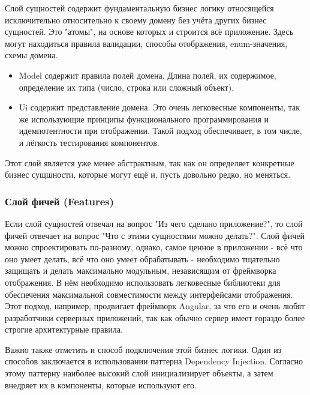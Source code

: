 \documentclass[14pt]{extarticle}
\begin{document}
Слой сущностей содержит фундаментальную бизнес логику относящейся исключительно относительно к своему домену без учёта других бизнес сущностей. 
Это "атомы", на основе которых и строится всё приложение. Здесь
могут находиться правила валидации, способы отображения, enum-значения, схемы домена.

\begin{itemize}
	\item Model содержит правила полей домена. Длина полей, их содержимое, определение их типа (число, строка или сложный объект).
	\item Ui содержит представление домена. Это очень легковесные компоненты, так же использующие принципы функционального программирования и идемпотентности
	при отображении. Такой подход обеспечивает, в том числе, и лёгкость тестирования компонентов.
\end{itemize}

Этот слой является уже менее абстрактным, так как он определяет конкретные бизнес сущшности, которые могут ещё и, пусть довольно редко, но меняться.

\subsubsection{Слой фичей (Features)}

Если слой сущностей отвечал на вопрос "Из чего сделано приложение?", то слой фичей отвечает на вопрос "Что с этими сущностями можно делать?". 
Слой фичей можно спроектировать по-разному, однако, самое ценное в приложении - всё что оно умеет делать, всё что оно умеет обрабатывать - необходимо
тщательно защищать и делать максимально модульным, независящим от фреймворка отображения. В нём необходимо использовать легковесные библиотеки
для обеспечения максимальной совместимости между интерфейсами отображения. Этот подход, например, продвигает фреймворк Angular, за что его и 
очень любят разработчики серверных приложений, так как обычно сервер имеет гораздо более строгие архитектурные правила.

Важно также отметить и способ подключения этой бизнес логики. Один из способов заключается в использовании паттерна Dependency Injection. Согласно
этому паттерну наиболее высокий слой инициализирует объекты, а затем внедряет их в компоненты, которые используют его.
\end{document}
